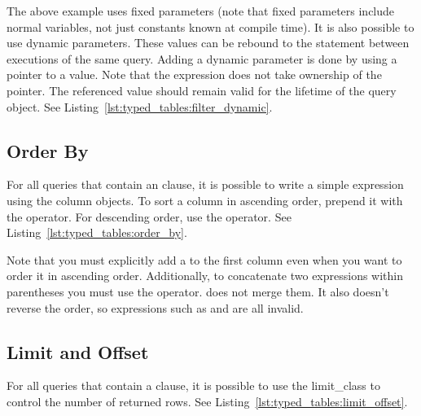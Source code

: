 

The above example uses fixed parameters (note that fixed parameters include normal variables, not just constants known at compile time). It is also possible to use dynamic parameters. These values can be rebound to the statement between executions of the same query. Adding a dynamic parameter is done by using a pointer to a value. Note that the expression does not take ownership of the pointer. The referenced value should remain valid for the lifetime of the query object. See Listing~\ref{lst:typed_tables:filter_dynamic}.



\subsection{Order By}
\label{section:typed_tables:order}

For all queries that contain an  clause, it is possible to write a simple expression using the column objects. To sort a column in ascending order, prepend it with the \code{+} operator. For descending order, use the \code{-} operator. See Listing~\ref{lst:typed_tables:order_by}.



Note that you must explicitly add a \code{+} to the first column even when you want to order it in ascending order. Additionally, to concatenate two expressions within parentheses you must use the \code{+} operator. \code{-} does not merge them. It also doesn't reverse the order, so expressions such as  and  are all invalid.

\subsection{Limit and Offset}
\label{section:typed_tables:limit}

For all queries that contain a  clause, it is possible to use the \gls{limit_class} to control the number of returned rows. See Listing~\ref{lst:typed_tables:limit_offset}.


